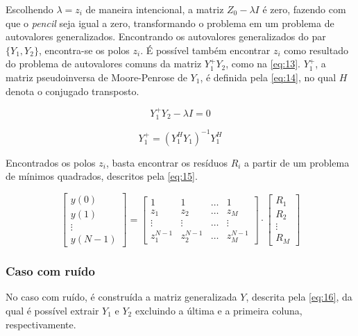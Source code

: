 \documentclass[12pt]{article}
\begin{document}
Escolhendo $\lambda = z_i$ de maneira intencional, a matriz $Z_0 - \lambda I$ é zero, fazendo com que o \textit{pencil} seja igual a zero, transformando o problema em um problema de autovalores generalizados. 
Encontrando os autovalores generalizados do par $\{Y_1, Y_2\}$, encontra-se os polos $z_i$. É possível também encontrar $z_i$ como resultado do problema de autovalores comuns da matriz $Y_1^+ Y_2$, como na
\autoref{eq:13}. $Y_1^+$, a matriz pseudoinversa de Moore-Penrose de $Y_1$, é definida pela \autoref{eq:14}, no qual $H$ denota o conjugado transposto. 

\begin{equation} \label{eq:13}
    Y_1^+ Y_2 - \lambda I = 0
\end{equation}

\begin{equation} \label{eq:14}
    Y_1^+= (Y_1^H Y_1)^{-1}Y_1^H
\end{equation}

Encontrados os polos $z_i$, basta encontrar os resíduos $R_i$ a partir de um problema de mínimos quadrados, descritos pela \autoref{eq:15}.

\begin{equation} \label{eq:15}
    \begin{bmatrix} y(0) \\
    y(1) \\
    \vdots \\
    y(N-1)
    \end{bmatrix} = 
    \begin{bmatrix} 1 & 1 & \dots & 1 \\
    z_1 & z_2 & \dots & z_M \\
    \vdots & \vdots & \dots & \vdots \\
    z_1^{N-1} & z_2^{N-1} & \dots & z_M^{N-1}
    \end{bmatrix} \cdot 
    \begin{bmatrix}
    R_1 \\
    R_2 \\
    \vdots \\
    R_{M}
    \end{bmatrix}
\end{equation}

\subsubsection{Caso com ruído} \label{sec:ruido}

No caso com ruído, é construída a matriz generalizada $Y$, descrita pela \autoref{eq:16}, da qual é possível extrair $Y_1$ e $Y_2$ excluindo a 
última e a primeira coluna, respectivamente. 
\end{document}
